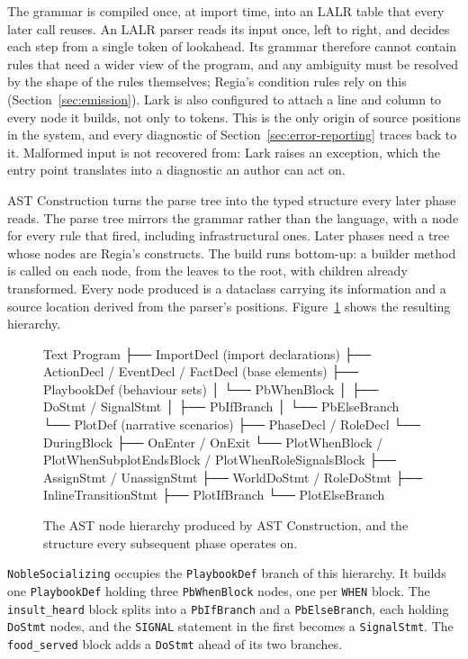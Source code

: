 The grammar is compiled once, at import time, into an LALR table that every later call reuses. An LALR parser reads its input once, left to right, and decides each step from a single token of lookahead. Its grammar therefore cannot contain rules that need a wider view of the program, and any ambiguity must be resolved by the shape of the rules themselves; Regia's condition rules rely on this (Section~\ref{sec:emission}). Lark is also configured to attach a line and column to every node it builds, not only to tokens. This is the only origin of source positions in the system, and every diagnostic of Section~\ref{sec:error-reporting} traces back to it. Malformed input is not recovered from: Lark raises an exception, which the entry point translates into a diagnostic an author can act on.
 
AST Construction turns the parse tree into the typed structure every later phase reads. The parse tree mirrors the grammar rather than the language, with a node for every rule that fired, including infrastructural ones. Later phases need a tree whose nodes are Regia's constructs. The build runs bottom-up: a builder method is called on each node, from the leaves to the root, with children already transformed. Every node produced is a dataclass carrying its information and a source location derived from the parser's positions. Figure~\ref{fig:ast-hierarchy} shows the resulting hierarchy.
 
\begin{figure}[htpb]
\centering
\begin{codeblock}[]{Text}
Program
├── ImportDecl                         (import declarations)
├── ActionDecl / EventDecl / FactDecl  (base elements)
├── PlaybookDef                        (behaviour sets)
│   └── PbWhenBlock
│       ├── DoStmt / SignalStmt
│       ├── PbIfBranch
│       └── PbElseBranch
└── PlotDef                            (narrative scenarios)
    ├── PhaseDecl / RoleDecl
    └── DuringBlock
        ├── OnEnter / OnExit
        └── PlotWhenBlock / PlotWhenSubplotEndsBlock / PlotWhenRoleSignalsBlock
            ├── AssignStmt / UnassignStmt
            ├── WorldDoStmt / RoleDoStmt
            ├── InlineTransitionStmt
            ├── PlotIfBranch
            └── PlotElseBranch
\end{codeblock}
\caption{The AST node hierarchy produced by AST Construction, and the structure every subsequent phase operates on.}
\label{fig:ast-hierarchy}
\end{figure}
 
\lstinline|NobleSocializing| occupies the \lstinline|PlaybookDef| branch of this hierarchy. It builds one \lstinline|PlaybookDef| holding three \lstinline|PbWhenBlock| nodes, one per \lstinline|WHEN| block. The \lstinline|insult_heard| block splits into a \lstinline|PbIfBranch| and a \lstinline|PbElseBranch|, each holding \lstinline|DoStmt| nodes, and the \lstinline|SIGNAL| statement in the first becomes a \lstinline|SignalStmt|. The \lstinline|food_served| block adds a \lstinline|DoStmt| ahead of its two branches.
 
